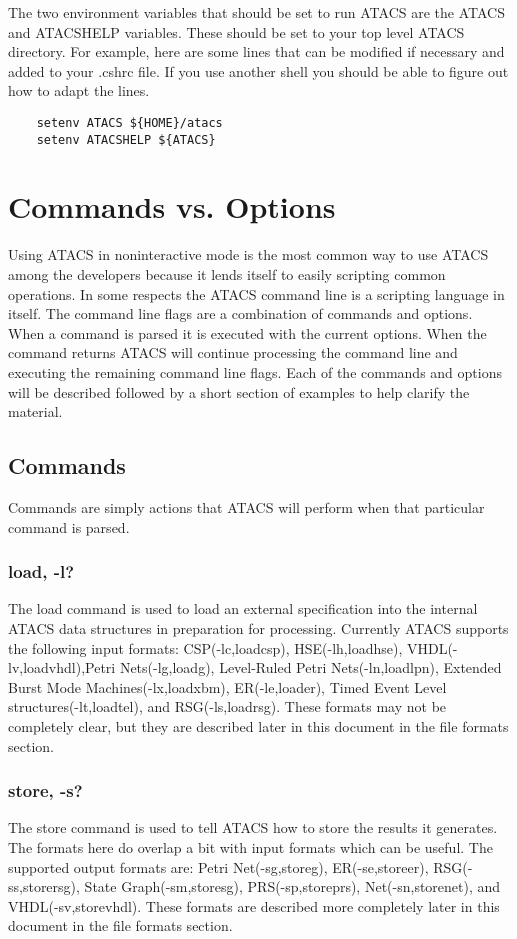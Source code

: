 \documentclass[titlepage,11pt]{article}
\begin{document}
  The two environment variables that should be set to run ATACS are
  the ATACS and ATACSHELP variables.  These should be set to your top
  level ATACS directory.  For example, here are some lines that can be
  modified if necessary and added to your .cshrc file.  If you use
  another shell you should be able to figure out how to adapt the
  lines.
  \begin{verbatim}
    setenv ATACS ${HOME}/atacs
    setenv ATACSHELP ${ATACS}
  \end{verbatim}
  
  \section{Commands vs. Options}
  Using ATACS in noninteractive mode is the most common way to use
  ATACS among the developers because it lends itself to easily
  scripting common operations.  In some respects the ATACS command
  line is a scripting language in itself.  The command line flags are
  a combination of commands and options.  When a command is parsed it
  is executed with the current options.  When the command returns
  ATACS will continue processing the command line and executing the
  remaining command line flags.  Each of the commands and options will
  be described followed by a short section of examples to help clarify
  the material.
  
  \subsection{Commands}
  Commands are simply actions that ATACS will perform when that
  particular command is parsed.
  
  \subsubsection{load, -l?}
  The load command is used to load an external specification into the
  internal ATACS data structures in preparation for processing.
  Currently ATACS supports the following input formats:
  CSP(-lc,loadcsp), HSE(-lh,loadhse), VHDL(-lv,loadvhdl),Petri
  Nets(-lg,loadg), Level-Ruled Petri Nets(-ln,loadlpn), Extended Burst
  Mode Machines(-lx,loadxbm), ER(-le,loader), Timed Event Level
  structures(-lt,loadtel), and RSG(-ls,loadrsg).  These formats may
  not be completely clear, but they are described later in this
  document in the file formats section.
  
  \subsubsection{store, -s?}
  The store command is used to tell ATACS how to store the results it
  generates.  The formats here do overlap a bit with input formats
  which can be useful.  The supported output formats are: Petri
  Net(-sg,storeg), ER(-se,storeer), RSG(-ss,storersg), State
  Graph(-sm,storesg), PRS(-sp,storeprs), Net(-sn,storenet), and
  VHDL(-sv,storevhdl).  These formats are described more completely
  later in this document in the file formats section.
  
\end{document}
